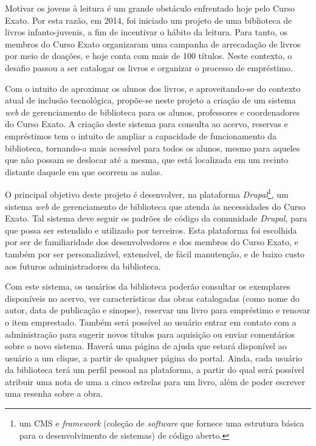 \documentclass[a4paper]{article}
\begin{document}
Motivar os jovens à leitura é um grande obstáculo enfrentado hoje pelo Curso Exato. Por esta razão, em 2014, foi iniciado um projeto de uma biblioteca de livros infanto-juvenis, a fim de incentivar o hábito da leitura. Para tanto, os membros do Curso Exato organizaram uma campanha de arrecadação de livros por meio de doações, e hoje conta com mais de 100 títulos. Neste contexto, o desafio passou a ser catalogar os livros e organizar o processo de empréstimo.

Com o intuito de aproximar os alunos dos livros, e aproveitando-se do contexto atual de inclusão tecnológica, propõe-se neste projeto a criação de um sistema \textit{web} de gerenciamento de biblioteca para os alunos, professores e coordenadores do Curso Exato. A criação deste sistema para consulta ao acervo, reservas e empréstimos tem o intuito de ampliar a capacidade de funcionamento da biblioteca, tornando-a mais acessível para todos os alunos, mesmo para aqueles que não possam se deslocar até a mesma, que está localizada em um recinto distante daquele em que ocorrem as aulas.

O principal objetivo deste projeto é desenvolver, na plataforma \textit{Drupal}\footnote{um CMS e \textit{framework} (coleção de \textit{software} que fornece uma estrutura básica para o desenvolvimento de sistemas) de código aberto.}, um sistema \textit{web} de gerenciamento de biblioteca que atenda às necessidades do Curso Exato. Tal sistema deve seguir os padrões de código da comunidade \textit{Drupal}, para que possa ser estendido e utilizado por terceiros. Esta plataforma foi escolhida por ser de familiaridade dos desenvolvedores e dos membros do Curso Exato, e também por ser personalizável, extensível, de fácil manutenção, e de baixo custo aos futuros administradores da biblioteca.

Com este sistema, os usuários da biblioteca poderão consultar os exemplares disponíveis no acervo, ver características das obras catalogadas (como nome do autor, data de publicação e sinopse), reservar um livro para empréstimo e renovar o item emprestado. Também será possível ao usuário entrar em contato com a administração para sugerir novos títulos para aquisição ou enviar comentários sobre o novo sistema. Haverá uma página de ajuda que estará disponível ao usuário a um clique, a partir de qualquer página do portal. Ainda, cada usuário da biblioteca terá um perfil pessoal na plataforma, a partir do qual será possível atribuir uma nota de uma a cinco estrelas para um livro, além de poder escrever uma resenha sobre a obra.
\end{document}
